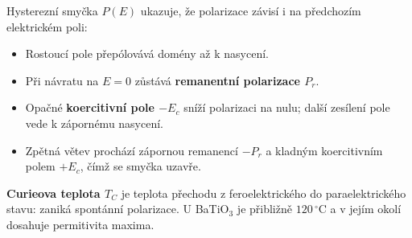 Hysterezní smyčka $P(E)$ ukazuje, že polarizace závisí i na předchozím elektrickém poli:
\begin{itemize}
\item Rostoucí pole přepólovává domény až k nasycení.
\item Při návratu na $E=0$ zůstává \textbf{remanentní polarizace $P_r$}.
\item Opačné \textbf{koercitivní pole $-E_c$} sníží polarizaci na nulu; další zesílení pole vede k zápornému nasycení.
\item Zpětná větev prochází zápornou remanencí $-P_r$ a kladným koercitivním polem $+E_c$, čímž se smyčka uzavře.
\end{itemize}
\textbf{Curieova teplota $T_C$} je teplota přechodu z feroelektrického do paraelektrického stavu: zaniká spontánní polarizace. U BaTiO$_3$ je přibližně $120\,^{\circ}\mathrm C$ a v jejím okolí dosahuje permitivita maxima.
